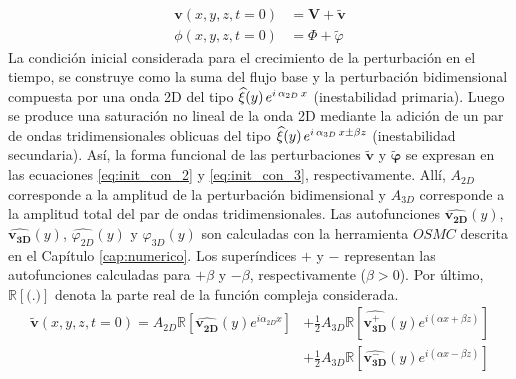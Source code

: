 \begin{equation}
\begin{aligned}
\mathbf{v}(x,y,z,t=0) &= \mathbf{V} + \widetilde{\mathbf{v}} \\
\phi(x,y,z,t=0) &= \Phi +  \widetilde{\varphi} 
\end{aligned}
\label{eq:init_con_1}
\end{equation}
La condición inicial considerada para el crecimiento de la perturbación en el tiempo, se construye como la suma del flujo base y la perturbación bidimensional compuesta por una onda 2D del tipo $\widehat{\xi}(y) \hspace{0.5mm} e^{i \hspace{0.5mm} \alpha_{2D} \hspace{0.5mm} x }$ (inestabilidad primaria). Luego se produce una saturación no lineal de la onda 2D mediante la adición de un par de ondas tridimensionales oblicuas del tipo $\widehat{\xi}(y) \hspace{0.5mm} e^{i \hspace{0.5mm} \alpha_{3D} \hspace{0.5mm} x \pm \beta z  }$ (inestabilidad secundaria). Así, la forma funcional de las perturbaciones $\widetilde{\mathbf{v}}$ y $\widetilde{\mathbf{\varphi}}$ se expresan en las ecuaciones \ref{eq:init_con_2} y \ref{eq:init_con_3}, respectivamente. Allí, $A_{2D}$ corresponde a la amplitud de la perturbación bidimensional y $A_{3D}$ corresponde a la amplitud total del par de ondas tridimensionales. Las autofunciones $\widehat{\mathbf{v^{}_{2D}}}(y)$, $\widehat{\mathbf{v^{}_{3D}}}(y)$, $\widehat{\varphi^{}_{2D}}(y)$ y $\widehat{\varphi^{}_{3D}}(y)$ son calculadas con la herramienta $OSMC$ descrita en el Capítulo \ref{cap:numerico}. Los superíndices $+$ y $-$ representan las autofunciones calculadas para $+ \beta$ y $- \beta$, respectivamente ($\beta>0$). 
Por último, $\mathbb{R}[\text{(.)}]$ denota la parte real de la función compleja considerada.  
\begin{equation}
\begin{aligned}
\widetilde{\mathbf{v}}(x,y,z,t=0) = A_{2D} \mathbb{R} \left[ \widehat{\mathbf{v^{}_{2D}}}(y) e^{\mathit{i} \alpha_{2D} x} \right] &+ \frac{1}{2} A_{3D} \mathbb{R} \left[ \widehat{\mathbf{v^{+}_{3D}}}(y) e^{\mathit{i} ( \alpha x + \beta z)} \right] \\
 &+ \frac{1}{2} A_{3D} \mathbb{R} \left[ \widehat{\mathbf{v^{-}_{3D}}}(y) e^{\mathit{i} ( \alpha x - \beta z)} \right]
\end{aligned}
\label{eq:init_con_2}
\end{equation}

